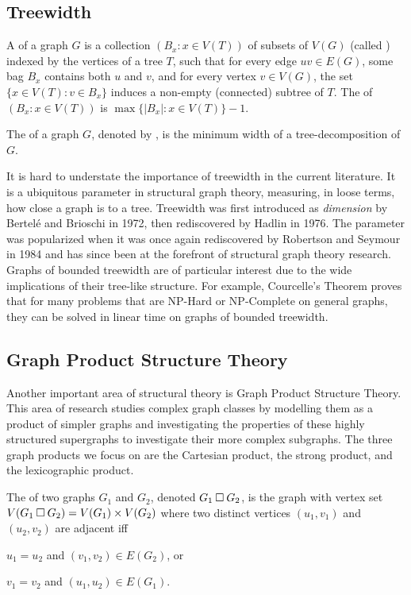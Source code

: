 \documentclass[../main.tex]{subfiles}
\begin{document}
\subsection{Treewidth}
A  of a graph $G$ is a collection $(B_x :x\in V(T))$ of subsets of $V(G)$ (called ) indexed by the vertices of a tree $T$, such that for every edge $uv\in E(G)$, some bag $B_x$ contains both $u$ and $v$, and for every vertex $v\in V(G)$, the set $\{x\in V(T):v\in B_x\}$ induces a non-empty (connected) subtree of $T$. The  of $(B_x:x\in V(T))$ is $\max\{|B_x| \colon x\in V(T)\}-1$. 

The  of a graph $G$, denoted by , is the minimum width of a tree-decomposition of $G$.

It is hard to understate the importance of treewidth in the current literature.
It is a ubiquitous parameter in structural graph theory, measuring, in loose terms, how close a graph is to a tree. 
Treewidth was first introduced as \textit{dimension} by  Bertel\'e  and Brioschi \cite[pp.~37--38]{BB1972} in 1972, then rediscovered by Hadlin \cite{Halin76} in 1976.
The parameter was popularized when it was once again rediscovered by Robertson and Seymour \cite{ROBERTSON198449} in 1984 and has since been at the forefront of structural graph theory research. Graphs of bounded treewidth are of particular interest due to the wide implications of their tree-like structure. For example, Courcelle's Theorem \cite{Courcelle90} proves that for many problems that are NP-Hard or NP-Complete on general graphs, they can be solved in linear time on graphs of bounded treewidth.

\subsection{Graph Product Structure Theory}
Another important area of structural theory is Graph Product Structure Theory. This area of research studies complex graph classes by modelling them as a product of simpler graphs and investigating the properties of these highly structured supergraphs to investigate their more complex subgraphs. The three graph products we focus on are the Cartesian product, the strong product, and the lexicographic product.

The  of two graphs $G_1$ and $G_2$, denoted $G_1 \mathbin{\Box} G_2$, is the graph with vertex set $V(G_1 \mathbin{\Box} G_2) = V(G_1) \times V(G_2)$ where two distinct vertices $(u_1, v_1)$ and $(u_2, v_2)$ are adjacent iff 
\begin{compactitem}
	\item $u_1 = u_2$ and $(v_1, v_2) \in E(G_2)$, or
	\item $v_1 = v_2$ and $(u_1, u_2) \in E(G_1)$.
\end{compactitem}
\end{document}
